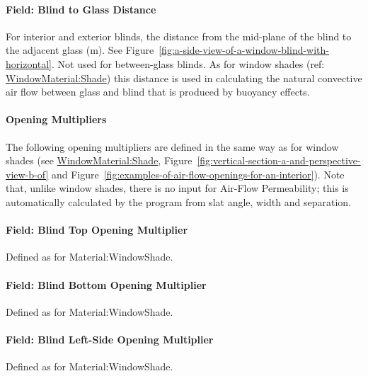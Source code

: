 \paragraph{Field: Blind to Glass Distance}\label{field-blind-to-glass-distance}

For interior and exterior blinds, the distance from the mid-plane of the blind to the adjacent glass (m). See Figure~\ref{fig:a-side-view-of-a-window-blind-with-horizontal}. Not used for between-glass blinds. As for window shades (ref: \hyperref[windowmaterialshade]{WindowMaterial:Shade}) this distance is used in calculating the natural convective air flow between glass and blind that is produced by buoyancy effects.

\paragraph{Opening Multipliers}\label{opening-multipliers}

The following opening multipliers are defined in the same way as for window shades (see \hyperref[windowmaterialshade]{WindowMaterial:Shade}, Figure~\ref{fig:vertical-section-a-and-perspective-view-b-of} and Figure~\ref{fig:examples-of-air-flow-openings-for-an-interior}). Note that, unlike window shades, there is no input for Air-Flow Permeability; this is automatically calculated by the program from slat angle, width and separation.

\paragraph{Field: Blind Top Opening Multiplier}\label{field-blind-top-opening-multiplier}

Defined as for Material:WindowShade.

\paragraph{Field: Blind Bottom Opening Multiplier}\label{field-blind-bottom-opening-multiplier}

Defined as for Material:WindowShade.

\paragraph{Field: Blind Left-Side Opening Multiplier}\label{field-blind-left-side-opening-multiplier}

Defined as for Material:WindowShade.

